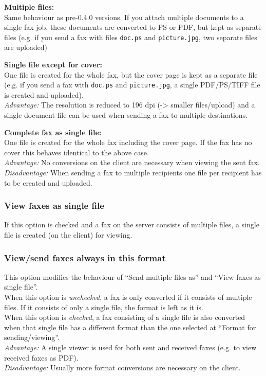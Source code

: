 \documentclass[a4paper,10pt]{scrartcl}
\begin{document}
{\parindent0pt
\textbf{Multiple files:}\\
Same behaviour as pre-0.4.0 versions. If you attach multiple documents to a single fax job, these documents are converted to PS or PDF, but kept as separate files (e.g. if you send a fax with files \texttt{doc.ps} and \texttt{picture.jpg}, two separate files are uploaded)
\medskip

\textbf{Single file except for cover:}\\
One file is created for the whole fax, but the cover page is kept as a separate file (e.g. if you send a fax with \texttt{doc.ps} and \texttt{picture.jpg}, a single PDF/PS/TIFF file is created and uploaded).\\
\textit{Advantage:} The resolution is reduced to 196 dpi (-> smaller files/upload) and a single document file can be used when sending a fax to multiple destinations.
\medskip

\textbf{Complete fax as single file:}\\
One file is created for the whole fax including the cover page. If the fax has no cover this behaves identical to the above case.\\
\textit{Advantage:} No conversions on the client are necessary when viewing the sent fax.\\
\textit{Disadvantage:} When sending a fax to multiple recipients one file per recipient has to be created and uploaded.
}

\subsubsection{View faxes as single file}
If this option is checked and a fax on the server consists of multiple files, a single file is created (on the client) for viewing.


\subsubsection{View/send faxes always in this format}
This option modifies the behaviour of ``Send multiple files as'' and ``View faxes as single file''.\\
When this option is \textit{unchecked}, a fax is only converted if it consists of multiple files. If it consists of only a single file, the format is left as it is.\\
When this option is \textit{checked}, a fax consisting of a single file is also converted when that single file has a different format than the one selected at ``Format for sending/viewing''.\\
\textit{Advantage:} A single viewer is used for both sent and received faxes (e.g. to view received faxes as PDF).\\
\textit{Disadvantage:} Usually more format conversions are necessary on the client.
\end{document}
